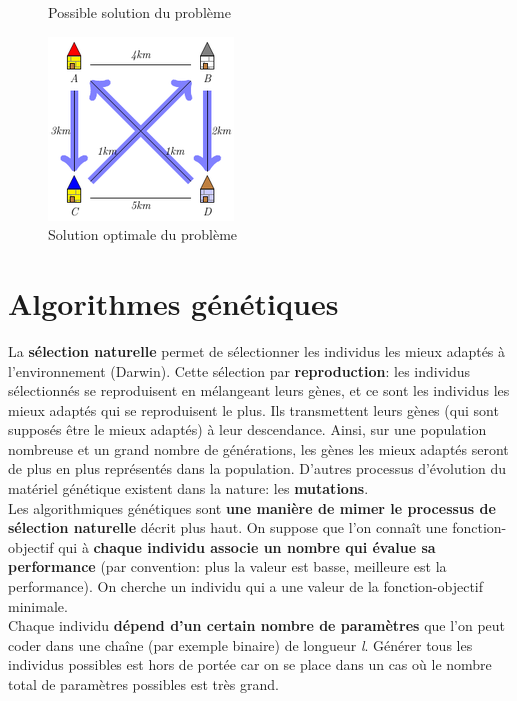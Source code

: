 \documentclass[12pt]{report}
\begin{document}
\begin{figure}[!htb]
  \caption{Possible solution du problème}\label{fig:pb2}
\endminipage\hfill
{}%
  \includegraphics[width=\linewidth]{img/pb3}
  \caption{Solution optimale du problème}\label{fig:pb3}
\endminipage
\end{figure}

\cleardoublepage
\chapter{Algorithmes génétiques}

La \textbf{sélection naturelle} permet de sélectionner les individus les mieux adaptés à l'environnement (Darwin). Cette sélection
par \textbf{reproduction}: les individus sélectionnés se reproduisent en mélangeant leurs gènes, et ce sont les individus les mieux 
adaptés qui se reproduisent le plus. Ils transmettent leurs gènes (qui sont supposés être le mieux adaptés) à leur descendance.
Ainsi, sur une population nombreuse et un grand nombre de générations, les gènes les mieux adaptés seront de plus en plus
représentés dans la population. D'autres processus d'évolution du matériel génétique existent dans la nature: les \textbf{mutations}. \\

Les algorithmiques génétiques sont \textbf{une manière de mimer le processus de sélection naturelle} décrit plus haut. On suppose que
l'on connaît une fonction-objectif qui à \textbf{chaque individu associe un nombre qui évalue sa performance} (par convention: plus 
la valeur est basse, meilleure est la performance). On cherche un individu qui a une valeur de la fonction-objectif minimale. \\
Chaque individu \textbf{dépend d'un certain nombre de paramètres} que l'on peut coder dans une chaîne (par exemple binaire) de longueur
\textit{l}. Générer tous les individus possibles est hors de portée car on se place dans un cas où le nombre total
de paramètres possibles est très grand.
\end{document}
